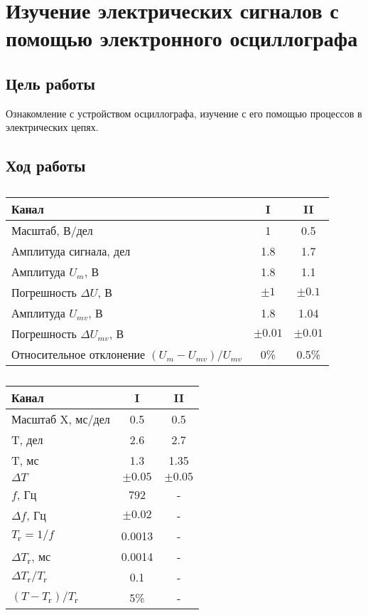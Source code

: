 \chapter{Изучение электрических сигналов с помощью электронного осциллографа}

\section{Цель работы}

Ознакомление с устройством осциллографа, изучение с его помощью процессов в электрических цепях.

\section{Ход работы}

\begin{table}[h]
	\caption{}
	\begin{tabular}{|p{10cm}|c|c|}
		\hline
		Канал & I & II \\ \hline
		Масштаб, В/дел & 1 & 0.5 \\ \hline
		Амплитуда сигнала, дел & 1.8 & 1.7 \\ \hline
		Амплитуда $U_m$, В & 1.8 & 1.1 \\ \hline
		Погрешность $\Delta U$, В & $\pm 1$ & $\pm 0.1$ \\ \hline
		Амплитуда $U_{mv}$, В & 1.8 & 1.04 \\ \hline
		Погрешность $\Delta U_{mv}$, В & $\pm 0.01 $ & $\pm 0.01$ \\ \hline
		Относительное отклонение $(U_m-U_{mv})/U_{mv}$ & 0\% & 0.5\% \\ \hline
	\end{tabular}
\end{table}

\begin{table}[h]
	\caption{}
	\begin{tabular}{|p{10cm}|c|c|}
		\hline
		Канал & I & II \\ \hline
		Масштаб X, мс/дел & 0.5 & 0.5 \\ \hline
		T, дел & 2.6 & 2.7 \\ \hline
		T, мс & 1.3 & 1.35 \\ \hline
		$\Delta T$ & $\pm 0.05$ & $\pm 0.05$ \\ \hline
		$f$, Гц & 792 & - \\ \hline
		$\Delta f$, Гц & $\pm 0.02$ & - \\ \hline
		$T_\text{г} = 1/f$ & 0.0013 & - \\ \hline
		$\Delta T_\text{г}$, мс & 0.0014 & - \\ \hline
		$\Delta T_\text{г}/T_\text{г}$ & 0.1 & - \\ \hline
		$(T-T_\text{г})/T_\text{г}$ & 5\% & - \\ \hline
	\end{tabular}
\end{table}


